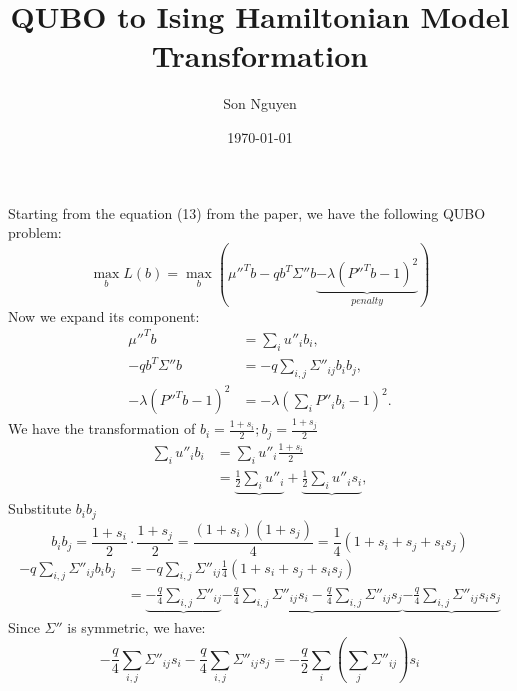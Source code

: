 \documentclass{article}
\title{QUBO to Ising Hamiltonian Model Transformation}
\author{Son Nguyen}
\date{\today}
\begin{document}
\maketitle
Starting from the equation (13) from the paper, we have the following QUBO problem:
\begin{equation}
	\max_{b} L(b) = \max_{b} \left(\mu''^Tb -qb^T\Sigma''b \underbrace{- \lambda(P''^T b-1)^2}_{penalty}\right)
\end{equation}
Now we expand its component:
\begin{align}
	\mu''^Tb              & = \sum_{i}^{} u''_i b_i,                             \\
	-qb^T\Sigma''b        & = -q \sum_{i,j}^{} \Sigma''_{ij} b_i b_j,            \\
	-\lambda(P''^T b-1)^2 & = -\lambda \left(\sum_{i}^{} P''_i b_i - 1\right)^2.
\end{align}
We have the transformation of \(b_i = \frac{1+s_i}{2}; b_j = \frac{1+s_j}{2}\)
\begin{align}
	\sum_{i}^{} u''_i b_i & = \sum_{i}^{} u''_i \frac{1+s_i}{2}                                                            \\
	                      & = \underbrace{\frac{1}{2} \sum_{i}^{} u''_i} + \underbrace{\frac{1}{2} \sum_{i}^{} u''_i s_i},
\end{align}
Substitute \(b_ib_j\)
\begin{equation}
	b_ib_j = \frac{1+s_i}{2} \cdot \frac{1+s_j}{2}  = \frac{(1+s_i)(1+s_j)}{4} = \frac{1}{4}(1 + s_i + s_j + s_is_j)
\end{equation}
\begin{align}
	-q \sum_{i,j}^{} \Sigma''_{ij} b_i b_j & = -q \sum_{i,j}^{} \Sigma''_{ij} \frac{1}{4}(1 + s_i + s_j + s_is_j)                                                                                                                                                          \\
	                                       & = \underbrace{-\frac{q}{4} \sum_{i,j}^{} \Sigma''_{ij}} \underbrace{-\frac{q}{4} \sum_{i,j}^{} \Sigma''_{ij} s_i - \frac{q}{4} \sum_{i,j}^{} \Sigma''_{ij} s_j} \underbrace{- \frac{q}{4} \sum_{i,j}^{} \Sigma''_{ij} s_is_j}
\end{align}
Since \(\Sigma''\) is symmetric, we have:
\begin{equation}
	-\frac{q}{4} \sum_{i,j}^{} \Sigma''_{ij} s_i -\frac{q}{4} \sum_{i,j}^{} \Sigma''_{ij} s_j = -\frac{q}{2} \sum_{i}^{} \left(\sum_{j}^{}\Sigma''_{ij}\right) s_i
\end{equation}
\end{document}
